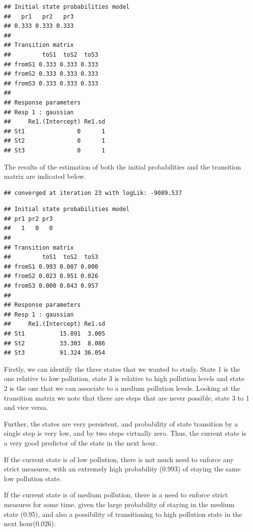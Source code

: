 \documentclass[
]{article}
\begin{document}
\begin{verbatim}
## Initial state probabilities model 
##   pr1   pr2   pr3 
## 0.333 0.333 0.333 
## 
## Transition matrix 
##         toS1  toS2  toS3
## fromS1 0.333 0.333 0.333
## fromS2 0.333 0.333 0.333
## fromS3 0.333 0.333 0.333
## 
## Response parameters 
## Resp 1 : gaussian 
##     Re1.(Intercept) Re1.sd
## St1               0      1
## St2               0      1
## St3               0      1
\end{verbatim}

The results of the estimation of both the initial probabilities and the
transition matrix are indicated below.

\begin{verbatim}
## converged at iteration 23 with logLik: -9089.537
\end{verbatim}

\begin{verbatim}
## Initial state probabilities model 
## pr1 pr2 pr3 
##   1   0   0 
## 
## Transition matrix 
##         toS1  toS2  toS3
## fromS1 0.993 0.007 0.000
## fromS2 0.023 0.951 0.026
## fromS3 0.000 0.043 0.957
## 
## Response parameters 
## Resp 1 : gaussian 
##     Re1.(Intercept) Re1.sd
## St1          15.891  3.005
## St2          33.303  8.086
## St3          91.324 36.054
\end{verbatim}

Firstly, we can identify the three states that we wanted to study. State
1 is the one relative to low pollution, state 3 is relative to high
pollution levels and state 2 is the one that we can associate to a
medium pollution levels. Looking at the transition matrix we note that
there are steps that are never possible, state 3 to 1 and vice versa.

Further, the states are very persistent, and probability of state
transition by a single step is very low, and by two steps virtually
zero. Thus, the current state is a very good predictor of the state in
the next hour.

If the current state is of low pollution, there is not much need to
enforce any strict measures, with an extremely high probability (0.993)
of staying the same low pollution state.

If the current state is of medium pollution, there is a need to enforce
strict measures for some time, given the large probability of staying in
the medium state (0.95), and also a possibility of transitioning to high
pollution state in the next hour(0.026).
\end{document}
